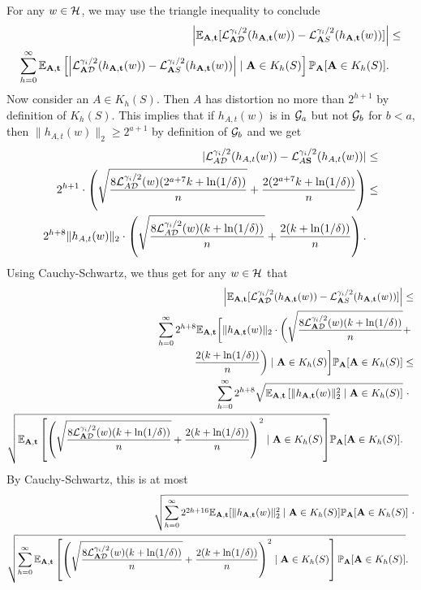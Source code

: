 For any $w \in \mathcal{H}$, we may use the triangle inequality to conclude
\begin{align*}
 \left|\mathbb{E}_{\mathbf{A},\mathbf{t}} [\mathcal{L}^{\gamma_i/2}_{\mathbf{A} \mathcal{D}}(h_{\mathbf{A},\mathbf{t}}(w)) - \mathcal{L}^{\gamma_i/2}_{\mathbf{A} S}(h_{\mathbf{A},\mathbf{t}}(w))]\right| &\leq \\
 \sum_{h=0}^\infty \mathbb{E}_{\mathbf{A},\mathbf{t}}\left[\left|\mathcal{L}^{\gamma_i/2}_{\mathbf{A} \mathcal{D}}(h_{\mathbf{A},\mathbf{t}}(w)) - \mathcal{L}^{\gamma_i/2}_{\mathbf{A} S}(h_{\mathbf{A},\mathbf{t}}(w))\right| \mid \mathbf{A} \in K_h(S)\right] \mathbb{P}_{\mathbf{A}}[\mathbf{A} \in K_h(S)].
\end{align*}
Now consider an $A \in K_h(S)$. Then $A$ has distortion no more than $2^{h+1}$ by definition of $K_h(S)$. This implies that if $h_{A,t}(w)$ is in $\mathcal{G}_a$ but not $\mathcal{G}_b$ for $b < a$, then $\|h_{A,t}(w)\|_2 \geq 2^{a+1}$ by definition of $\mathcal{G}_b$ and we get
\begin{align*}
|\mathcal{L}_{A\mathcal{D}}^{\gamma_i/2}(h_{A,t}(w)) - \mathcal{L}_{A\mathbf{S}}^{\gamma_i/2}(h_{A,t}(w))| &\leq\\
2^{h+1} \cdot \left(\sqrt{\frac{8\mathcal{L}_{A \mathcal{D}}^{\gamma_i/2}(w)(2^{a+7}k + \ln(1/\delta))}{n}} + \frac{2 (2^{a+7}k + \ln(1/\delta))}{n}\right) 
&\leq \\
2^{h+8}  \|h_{A,t}(w)\|_2 \cdot \left(\sqrt{\frac{8\mathcal{L}_{A \mathcal{D}}^{\gamma_i/2}(w)(k + \ln(1/\delta))}{n}} + \frac{2 (k + \ln(1/\delta))}{n}\right).
\end{align*}
Using Cauchy-Schwartz, we thus get for any $w \in \mathcal{H}$ that
\begin{align*}
 \left|\mathbb{E}_{\mathbf{A},\mathbf{t}} [\mathcal{L}^{\gamma_i/2}_{\mathbf{A} \mathcal{D}}(h_{\mathbf{A},\mathbf{t}}(w)) - \mathcal{L}^{\gamma_i/2}_{\mathbf{A} S}(h_{\mathbf{A},\mathbf{t}}(w))]\right| &\leq \\
\sum_{h=0}^\infty 2^{h+8} \mathbb{E}_{\mathbf{A},\mathbf{t}}\bigg[\|h_{\mathbf{A},\mathbf{t}}(w)\|_2  \cdot  \bigg(\sqrt{\frac{8\mathcal{L}_{\mathbf{A} \mathcal{D}}^{\gamma_i/2}(w)(k + \ln(1/\delta))}{n}} &+\\
\frac{2 (k + \ln(1/\delta))}{n}\bigg)\mid \mathbf{A} \in K_h(S)\bigg]\mathbb{P}_{\mathbf{A}}[\mathbf{A} \in K_h(S)]&\leq \\
\sum_{h=0}^\infty 2^{h+8} \sqrt{\mathbb{E}_{\mathbf{A},\mathbf{t}}\left[\|h_{\mathbf{A},\mathbf{t}}(w)\|^2_2  \mid \mathbf{A} \in K_h(S) \right]} &\ \cdot \\
\sqrt{\mathbb{E}_{\mathbf{A},\mathbf{t}}\left[ \left(\sqrt{\frac{8\mathcal{L}_{\mathbf{A} \mathcal{D}}^{\gamma_i/2}(w)(k + \ln(1/\delta))}{n}} + \frac{2 (k + \ln(1/\delta))}{n}\right)^2\mid \mathbf{A} \in K_h(S)\right]}\mathbb{P}_{\mathbf{A}}[\mathbf{A} \in K_h(S)].
\end{align*}
By Cauchy-Schwartz, this is at most
\begin{align*}
\sqrt{\sum_{h=0}^\infty 2^{2h+16}\mathbb{E}_{\mathbf{A},\mathbf{t}}[\|h_{\mathbf{A},\mathbf{t}}(w)\|_2^2 \mid \mathbf{A} \in K_h(S) ]  \mathbb{P}_{\mathbf{A}}[\mathbf{A} \in K_h(S)]} &\ \cdot\\
\sqrt{\sum_{h=0}^\infty \mathbb{E}_{\mathbf{A},\mathbf{t}}\left[ \left(\sqrt{\frac{8\mathcal{L}_{\mathbf{A} \mathcal{D}}^{\gamma_i/2}(w)(k + \ln(1/\delta))}{n}} + \frac{2 (k + \ln(1/\delta))}{n}\right)^2\mid \mathbf{A} \in K_h(S)\right]\mathbb{P}_{\mathbf{A}}[\mathbf{A} \in K_h(S)] }.
\end{align*}
